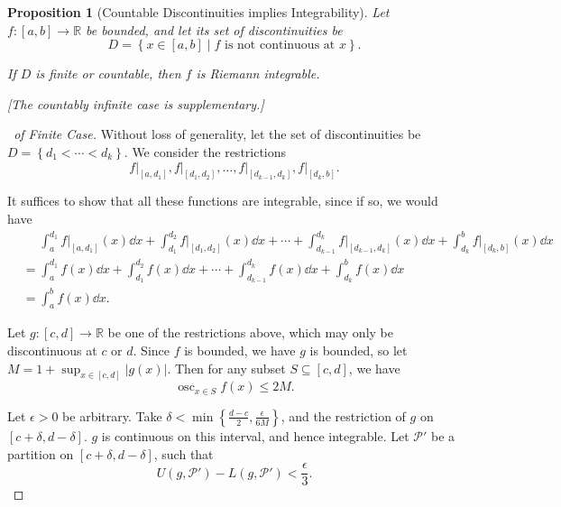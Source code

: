 \documentclass[11pt]{article}
\numberwithin{equation}{section}
\newtheorem{proposition}[theorem]{Proposition}
\theoremstyle{definition}
\theoremstyle{remark}
\newcommand{\pqty}[1]{\left(#1\right)}
\newcommand{\Bqty}[1]{\left\{#1\right\}}
\newcommand{\abs}[1]{\left|#1\right|}
\newcommand{\set}[2]{\left\{#1\mid #2\right\}}
\newcommand{\ccintv}[2]{[#1,#2]}
\newcommand{\functiondomain}[3]{#1:#2\to #3}
\newcommand{\RR}{\mathbb R}
\newcommand{\rightbar}[1]{\left.#1\right|}
\DeclareMathOperator{\osc}{osc}
\newcommand{\partition}{\mathcal P}
\newcommand{\upperSum}{U}
\newcommand{\lowerSum}{L}
\begin{document}
\begin{proposition}[Countable Discontinuities implies Integrability]\label{analysis-unit-0157}
    \label{prop:countable-discontinuity-implies-integrability}%
    Let \(\functiondomain{f}{\ccintv{a}{b}}{\RR}\) be bounded, and let its set of discontinuities be
    \[
        D = \set{x \in \ccintv{a}{b}}{f \text{ is not continuous at }x}.
    \]
    
    If \(D\) is finite or countable, then \(f\) is Riemann integrable.
    
    \textit{[The countably infinite case is supplementary.]}
\end{proposition}

\begin{proof}[\proofname\ of Finite Case]
    Without loss of generality, let the set of discontinuities be \(D = \Bqty{d_1 < \cdots < d_k}\). We consider the restrictions
    \[
        \rightbar{f}_{\ccintv{a}{d_1}}, \rightbar{f}_{\ccintv{d_1}{d_2}}, \ldots, \rightbar{f}_{\ccintv{d_{k - 1}}{d_k}}, \rightbar{f}_{\ccintv{d_k}{b}}.
    \]

    It suffices to show that all these functions are integrable, since if so, we would have
    \begin{align*}
        &\phantom{=} \int_{a}^{d_1} \rightbar{f}_{\ccintv{a}{d_1}} \pqty{x} \dd{x} + \int_{d_1}^{d_2} \rightbar{f}_{\ccintv{d_1}{d_2}} \pqty{x} \dd{x} + \cdots + \int_{d_{k - 1}}^{d_k} \rightbar{f}_{\ccintv{d_{k - 1}}{d_k}} \pqty{x} \dd{x} + \int_{d_k}^{b} \rightbar{f}_{\ccintv{d_k}{b}} \pqty{x} \dd{x} \\
        &= \int_{a}^{d_1} f\pqty{x} \dd{x} + \int_{d_1}^{d_2} f\pqty{x} \dd{x} + \cdots + \int_{d_{k - 1}}^{d_k} f\pqty{x} \dd{x} + \int_{d_k}^{b} f\pqty{x} \dd{x} \\
        &= \int_{a}^{b} f\pqty{x} \dd{x}.
    \end{align*}

    Let \(\functiondomain{g}{\ccintv{c}{d}}{\RR}\) be one of the restrictions above, which may only be discontinuous at \(c\) or \(d\). Since \(f\) is bounded, we have \(g\) is bounded, so let \(M = 1+\sup_{x \in \ccintv{c}{d}} \abs{g\pqty{x}}\). Then for any subset \(S \subseteq \ccintv{c}{d}\), we have
    \[
        \osc_{x \in S} f\pqty{x} \leq 2M.
    \]

    Let \(\epsilon > 0\) be arbitrary. Take \(\delta < \min\Bqty{\frac{d - c}{2}, \frac{\epsilon}{6M}}\), and the restriction of \(g\) on \(\ccintv{c + \delta}{d - \delta}\). \(g\) is continuous on this interval, and hence integrable. Let \(\partition'\) be a partition on \(\ccintv{c + \delta}{d - \delta}\), such that
    \[
        \upperSum\pqty{g, \partition'} - \lowerSum\pqty{g, \partition'} < \frac{\epsilon}{3}.
    \]


\end{proof}
\end{document}
